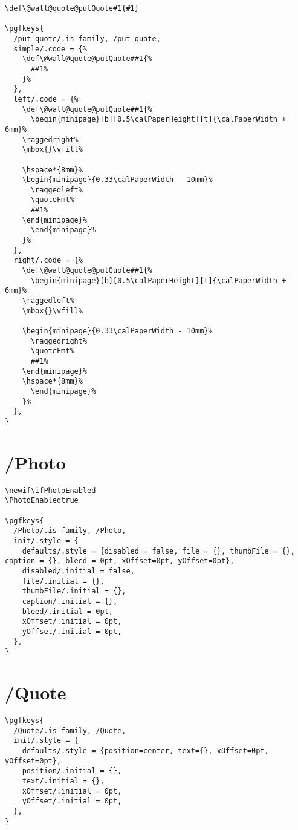 \documentclass[11pt,oneside]{memoir-article}
\begin{document}
\begin{verbatim}
\def\@wall@quote@putQuote#1{#1}

\pgfkeys{
  /put quote/.is family, /put quote,
  simple/.code = {%
    \def\@wall@quote@putQuote##1{%
      ##1%
    }%
  },
  left/.code = {%
    \def\@wall@quote@putQuote##1{%
      \begin{minipage}[b][0.5\calPaperHeight][t]{\calPaperWidth + 6mm}%
	\raggedright%
	\mbox{}\vfill%

	\hspace*{8mm}%
	\begin{minipage}{0.33\calPaperWidth - 10mm}%
	  \raggedleft%
	  \quoteFmt%
	  ##1%
	\end{minipage}%
      \end{minipage}%
    }%
  },
  right/.code = {%
    \def\@wall@quote@putQuote##1{%
      \begin{minipage}[b][0.5\calPaperHeight][t]{\calPaperWidth + 6mm}%
	\raggedleft%
	\mbox{}\vfill%

	\begin{minipage}{0.33\calPaperWidth - 10mm}%
	  \raggedright%
	  \quoteFmt%
	  ##1%
	\end{minipage}%
	\hspace*{8mm}%
      \end{minipage}%
    }%
  },
}
\end{verbatim}

\section{/Photo}
\label{sec:org7a9c88c}

\begin{verbatim}
\newif\ifPhotoEnabled
\PhotoEnabledtrue

\pgfkeys{
  /Photo/.is family, /Photo,
  init/.style = {
    defaults/.style = {disabled = false, file = {}, thumbFile = {}, caption = {}, bleed = 0pt, xOffset=0pt, yOffset=0pt},
    disabled/.initial = false,
    file/.initial = {},
    thumbFile/.initial = {},
    caption/.initial = {},
    bleed/.initial = 0pt,
    xOffset/.initial = 0pt,
    yOffset/.initial = 0pt,
  },
}
\end{verbatim}

\section{/Quote}
\label{sec:org8a930be}

\begin{verbatim}
\pgfkeys{
  /Quote/.is family, /Quote,
  init/.style = {
    defaults/.style = {position=center, text={}, xOffset=0pt, yOffset=0pt},
    position/.initial = {},
    text/.initial = {},
    xOffset/.initial = 0pt,
    yOffset/.initial = 0pt,
  },
}
\end{verbatim}
\end{document}
